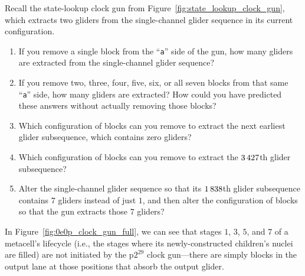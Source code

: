 \begin{multicols}{2}
\begin{problem}
\begin{enumerate}
	\end{enumerate}
	\end{problem}


	\mfilbreak
	
	
	\begin{problem}\label{exer:0e0p_state_lookup_gun}
		Recall the state-lookup clock gun from Figure~\ref{fig:state_lookup_clock_gun}, which extracts two gliders from the single-channel glider sequence in its current configuration.\smallskip
		
		\begin{enumerate}[label=\bf\color{ocre}(\alph*)]
			\item {} If you remove a single block from the ``\texttt{a}'' side of the gun, how many gliders are extracted from the single-channel glider sequence?
			
			\item {} If you remove two, three, four, five, six, or all seven blocks from that same ``\texttt{a}'' side, how many gliders are extracted? How could you have predicted these answers without actually removing those blocks?
			
			\item {} Which configuration of blocks can you remove to extract the next earliest glider subsequence, which contains zero gliders?
			
			\item {} Which configuration of blocks can you remove to extract the $3{\,}427$th glider subsequence?
			
			\item {} Alter the single-channel glider sequence so that its $1{\,}838$th glider subsequence contains $7$ gliders instead of just $1$, and then alter the configuration of blocks so that the gun extracts those $7$ gliders?
		\end{enumerate}
	\end{problem}


	\mfilbreak
	
	
	\begin{problem}\label{exer:0e0p_why_blocks_clock_lane} 
		In Figure~\ref{fig:0e0p_clock_gun_full}, we can see that stages $1$, $3$, $5$, and $7$ of a metacell's lifecycle (i.e., the stages where its newly-constructed children's nuclei are filled) are not initiated by the p$2^{29}$ clock gun---there are simply blocks in the output lane at those positions that absorb the output glider.
		

\end{problem}
\end{multicols}

